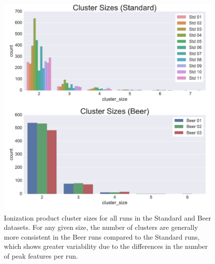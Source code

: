 \begin{figure}[!htbp]
\centering
\includegraphics[width=1.0\linewidth]{05-precursor-cluster/figures/counts_cluster.pdf}
\caption{\label{fig:cluster-counts} Ionization product cluster sizes for all runs in the Standard and Beer datasets. For any given size, the number of clusters are generally more consistent in the Beer runs compared to the Standard runs, which shows greater variability due to the differences in the number of peak features per run.}
\end{figure}

